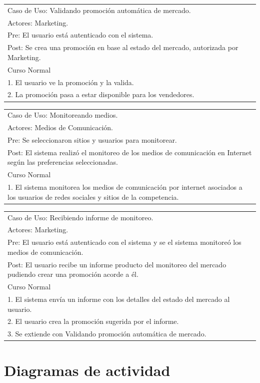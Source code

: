 \vspace{1cm}

\begin{tabular}{ | p{14cm} | }
  \hline
  Caso de Uso: Validando promoción automática de mercado. \\
  Actores: Marketing. \\
  Pre: El usuario está autenticado con el sistema. \\
  Post: Se crea una promoción en base al estado del mercado, autorizada por Marketing. \\
  \hline
  Curso Normal\\
  \hline
  1. El usuario ve la promoción y la valida. \\
  2. La promoción pasa a estar disponible para los vendedores. \\
  \hline
\end{tabular}

\vspace{1cm}

\begin{tabular}{ | p{14cm} | }
  \hline
  Caso de Uso: Monitoreando medios.\\
  Actores: Medios de Comunicación. \\
  Pre: Se seleccionaron sitios y usuarios para monitorear. \\
  Post: El sistema realizó el monitoreo de los medios de comunicación en Internet según las preferencias seleccionadas. \\
  \hline
  Curso Normal\\
  \hline
  1. El sistema monitorea los medios de comunicación por internet asociados a los usuarios de redes sociales y sitios de la competencia. \\
  \hline
\end{tabular}

\vspace{1cm}

\begin{tabular}{ | p{14cm} | }
  \hline
  Caso de Uso: Recibiendo informe de monitoreo. \\
  Actores: Marketing. \\
  Pre: El usuario está autenticado con el sistema y se el sistema monitoreó los medios de comunicación. \\
  Post: El usuario recibe un informe producto del monitoreo del mercado pudiendo crear una promoción acorde a él. \\
  \hline
  Curso Normal\\
  \hline
  1. El sistema envía un informe con los detalles del estado del mercado al usuario. \\
  2. El usuario crea la promoción sugerida por el informe. \\
  3. Se extiende con Validando promoción automática de mercado. \\
  \hline
\end{tabular}

\clearpage

\section{Diagramas de actividad}

\clearpage
